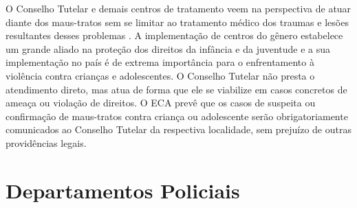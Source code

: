 O Conselho Tutelar e demais centros de tratamento veem na perspectiva de atuar diante dos maus-tratos sem se limitar ao tratamento médico dos traumas e lesões resultantes desses problemas \cite{brasil2002notificaccao}. A implementação de centros do gênero estabelece um grande aliado na proteção dos direitos da infância e da juventude e a sua implementação no país é de extrema importância para o enfrentamento à violência contra crianças e adolescentes. %
O Conselho Tutelar não presta o atendimento direto, mas atua de forma que ele se viabilize em casos concretos de ameaça ou violação de direitos. O ECA prevê que os casos de suspeita ou confirmação de maus-tratos contra criança ou adolescente serão obrigatoriamente comunicados ao Conselho Tutelar da respectiva localidade, sem prejuízo de outras providências legais.





\section{Departamentos Policiais}\label{sec:dp}%



